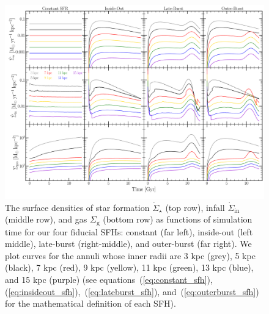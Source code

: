 \documentclass[fleqn, usenatbib]{mnras}
\newcommand{\refp}[1]{(\ref{#1})}
\begin{document}
\begin{figure} 
\centering 
\includegraphics[scale = 0.32]{evol.pdf} 
\caption{The surface densities of star formation $\dot{\Sigma}_\star$ (top 
row), infall $\dot{\Sigma}_\text{in}$ (middle row), and gas $\Sigma_\text{g}$ 
(bottom row) as functions of simulation time for our four fiducial SFHs: 
constant (far left), inside-out (left middle), late-burst (right-middle), 
and outer-burst (far right). We plot curves for the annuli whose inner radii 
are 3 kpc (grey), 5 kpc (black), 7 kpc (red), 9 kpc (yellow), 11 kpc (green), 
13 kpc (blue), and 15 kpc (purple) (see equations~\refp{eq:constant_sfh}, 
\refp{eq:insideout_sfh},~\refp{eq:lateburst_sfh}, and~\refp{eq:outerburst_sfh} 
for the mathematical definition of each SFH). } 
\label{fig:evol} 
\end{figure} 
\end{document}
